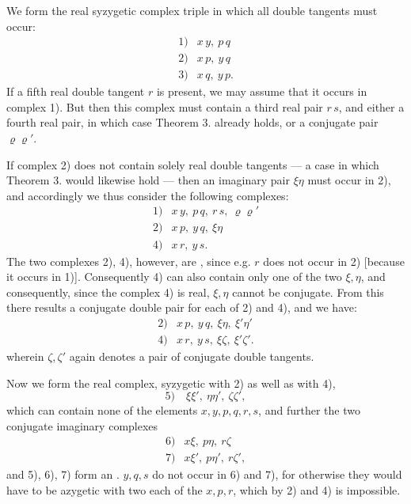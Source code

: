 We form the real syzygetic complex triple in which all
double tangents must occur:
\[
\begin{array}{rl}
1) & x\,y,\ p\,q \\
2) & x\,p,\ y\,q \\
3) & x\,q,\ y\,p.
\end{array}
\]
If a fifth real double tangent $r$ is present, we may assume
that it occurs in complex 1). But then this complex must
contain a third real pair $r\,s$, and either a fourth real pair,
in which case Theorem 3. already holds, or a conjugate
pair $\varrho\varrho'$.

If complex 2) does not contain solely real double tangents —
a case in which Theorem 3. would likewise hold — then an
imaginary pair $\xi\eta$ must occur in 2), and accordingly we thus consider the
following complexes:
\[
\begin{array}{rl}
1) & x\,y,\ p\,q,\ r\,s,\ \varrho\varrho' \\
2) & x\,p,\ y\,q,\ \xi\eta \\
4) & x\,r,\ y\,s.
\end{array}
\]
The two complexes 2), 4), however, are , since e.g. $r$ does not
occur in 2) [because it occurs in 1)]. Consequently 4) can also contain
only one of the two $\xi, \eta$, and consequently, since the complex
4) is real, $\xi, \eta$ cannot be conjugate. From this there results a
conjugate double pair for each of 2) and 4), and we have:
\[
\begin{array}{rl}
2) & x\,p,\ y\,q,\ \xi\eta,\ \xi'\eta' \\
4) & x\,r,\ y\,s,\ \xi\zeta,\ \xi'\zeta'.
\end{array}
\]
wherein $\zeta, \zeta'$ again denotes a pair of conjugate double tangents.

Now we form the real complex, syzygetic with 2) as well
as with 4),
\[
5)\quad \xi\xi',\ \eta\eta',\ \zeta\zeta',
\]
which can contain none of the elements $x, y, p, q, r, s$, and further the
two conjugate imaginary complexes
\[
\begin{array}{rl}
6) & x\xi,\ p\eta,\ r\zeta \\
7) & x\xi',\ p\eta',\ r\zeta',
\end{array}
\]
and 5), 6), 7) form an . $y, q, s$ do not occur in 6)
and 7), for otherwise they would have to be azygetic with two each
of the $x, p, r$, which by 2) and 4) is impossible.
